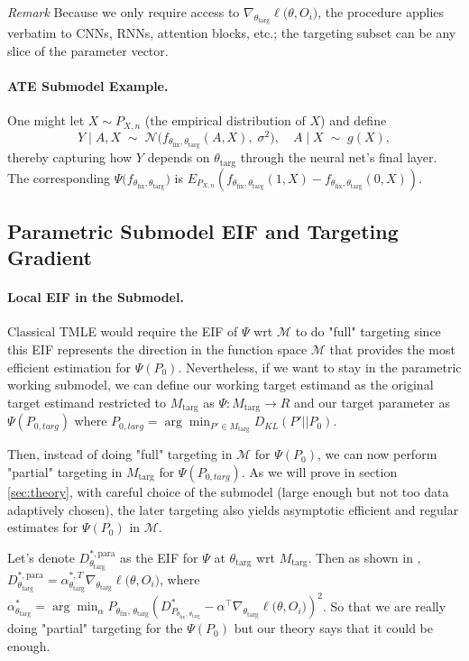 \documentclass{article}
\theoremstyle{remark}
\begin{document}
\emph{Remark } Because we only require access to $\nabla_{\theta_{\text{targ}}}\ell\bigl(\theta,O_i\bigr)$, the procedure applies verbatim to CNNs, RNNs, attention blocks, etc.; the targeting subset can be any slice of the parameter vector.

\paragraph{ATE Submodel Example.}
One might let $X\sim P_{X,n}$ (the empirical distribution of $X$) and define 
\[
  Y\mid A,X \;\sim\; \mathcal{N}\!\bigl(f_{\theta_{\text{fix}},\theta_{\text{targ}}}(A,X),\;\sigma^2\bigr),\quad
  A\mid X\;\sim\;g(X),
\]
thereby capturing how $Y$ depends on $\theta_{\text{targ}}$ through the neural net’s final layer. The corresponding $\Psi\bigl(f_{\theta_{\text{fix}},\theta_{\text{targ}}}\bigr)$ is $E_{P_{X,n}}(f_{\theta_{\text{fix}},\theta_{\text{targ}}}(1,X)-f_{\theta_{\text{fix}},\theta_{\text{targ}}}(0,X))$.

\subsection{Parametric Submodel EIF and Targeting Gradient}
\label{sec:method:proj}

\paragraph{Local EIF in the Submodel.}
Classical TMLE would require the EIF of $\Psi$ wrt $\mathcal{M}$ to do "full" targeting since this EIF represents the direction in the function space $\mathcal{M}$ that provides the most efficient estimation for $\Psi(P_0)$. Nevertheless, if we want to stay in the parametric working submodel, we can define our working target estimand as the original target estimand restricted to $M_{\text{targ}}$ as $\Psi:M_{\text{targ}} \to R$ and our target parameter as $\Psi(P_{0,\textit{targ}})$ where $P_{0,\textit{targ}}=\arg\min_{P'\in M_{\text{targ}}}D_{KL}(P'||P_0)$.

Then, instead of doing "full" targeting in $\mathcal{M}$ for $\Psi(P_0)$, we can now perform "partial" targeting in $M_{\text{targ}}$ for $\Psi(P_{0,\textit{targ}})$. As we will prove in section \ref{sec:theory}, with careful choice of the submodel (large enough but not too data adaptively chosen), the later targeting also yields asymptotic efficient and regular estimates for $\Psi(P_0)$ in $\mathcal{M}$.

Let's denote $D^{*,\text{para}}_{\theta_{\text{targ}}}$ as the EIF for $\Psi$ at $\theta_{\text{targ}}$ wrt $M_{\text{targ}}$. Then as shown in \cite[Ch.~8]{van2018targeted} \cite{van2023adaptive}, $D^{*,\text{para}}_{\theta_{\text{targ}}}=\alpha^{*,T}_{\theta_{\text{targ}}} \nabla_{\theta_{\text{targ}}}\ell\bigl(\theta,O_i\bigr)$, where $ \alpha^*_{\theta_{\text{targ}}}=\arg\min_{\alpha} P_{\theta_{\text{fix}},\,\theta_{\text{targ}}}(D^*_{P_{\theta_{\text{fix}},\,\theta_{\text{targ}}}}-\alpha^\top \nabla_{\theta_{\text{targ}}}\ell\bigl(\theta,O_i\bigr))^2$. So that we are really doing "partial" targeting for the $\Psi(P_0)$ but our theory says that it could be enough.
\end{document}
